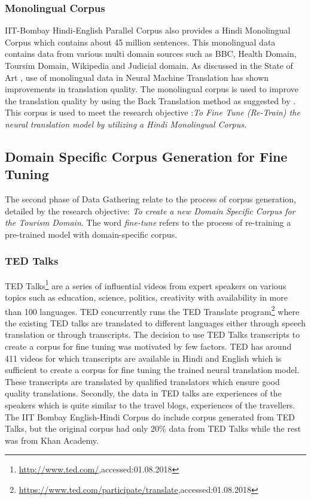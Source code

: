 \subsubsection{Monolingual Corpus}
\label{sec:mono}
IIT-Bombay Hindi-English Parallel Corpus also provides a Hindi Monolingual Corpus which contains about 45 million sentences. This monolingual data contains data from various multi domain sources such as BBC, Health Domain, Toursim Domain, Wikipedia and Judicial domain. As discussed in the State of Art , use of monolingual data in Neural Machine Translation has shown improvements in translation quality. The monolingual corpus is used to improve the translation quality by using the Back Translation method as suggested by \cite{DBLP:journals/corr/SennrichHB15a}. This corpus is used to meet the research objective :\textit{To Fine Tune (Re-Train) the neural translation model by utilizing a Hindi Monolingual Corpus.}

\subsection{Domain Specific Corpus Generation for Fine Tuning}
The second phase of Data Gathering relate to the process of corpus generation, detailed by the research objective: \textit{To create a new Domain Specific Corpus for the Tourism Domain}. The word \textit{fine-tune} refers to the process of re-training a pre-trained model with domain-specific corpus.

\subsubsection{TED Talks} 
TED Talks\footnote{\url{http://www.ted.com/},accessed:01.08.2018} are a series of influential videos from expert speakers on various topics such as education, science, politics, creativity with availability in more than 100 languages. TED concurrently runs the TED Translate program\footnote{\url{https://www.ted.com/participate/translate},accessed:01.08.2018} where the existing TED talks are translated to different languages either through speech translation or through transcripts. The decision to use TED Talks transcripts to create a corpus for fine tuning was motivated by few factors. TED has around 411 videos for which transcripts are available in Hindi and English which is sufficient to create a corpus for fine tuning the trained neural translation model. These transcripts are translated by qualified translators which ensure good quality translations. Secondly, the data in TED talks are experiences of the speakers which is quite similar to the travel blogs, experiences of the travellers. The IIT Bombay English-Hindi Corpus do include corpus generated from TED Talks\citep{Abdelali2014TheAC}, but the original corpus had only 20\% data from TED Talks while the rest was from Khan Academy.

